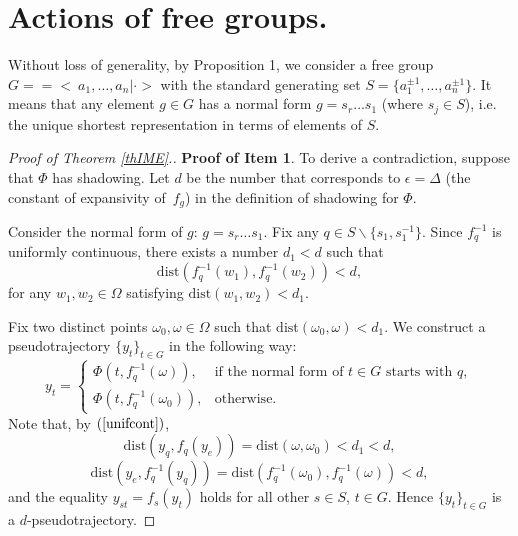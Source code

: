 \section{Actions of free groups.}

Without loss of generality, by Proposition 1, we consider a free group $G=\allowbreak=<~a_1,\ldots,a_n|\cdot>$ with the standard generating set $S = \{a_1^{\pm 1},\ldots,a_n^{\pm 1}\}$.
It means that any element $g\in G$ has a normal form $g=s_r\ldots s_1$ (where $s_j\in S$), i.e. the unique shortest representation in terms of elements of $S$.

\begin{proof}[Proof of Theorem \ref{thIME}.]

\textbf{Proof of Item 1}.
 To derive a contradiction, suppose that $\Phi$ has shadowing. Let $d$ be the number that corresponds to $\epsilon=\Delta$ (the constant of expansivity of~$f_g$) in the definition of shadowing for $\Phi$.

Consider the normal form of $g$: $g=s_r\ldots s_1$.
Fix any $q\in S\backslash \{s_1, s_1^{-1}\}$.
Since $f_{q}^{-1}$ is uniformly continuous, there exists a number $d_1<d$ such that
\begin{equation}
\label{unifcont}
\mbox{dist}(f_{q}^{-1}(w_1),f_{q}^{-1}(w_2))< d,
\end{equation}
for any $w_1,w_2\in\Omega$ satisfying $\mbox{dist}(w_1,w_2)< d_1$.

Fix two distinct points $\omega_0,\omega\in \Omega$ such that $\mbox{dist}(\omega_0,\omega)< d_1$. We construct a pseudotrajectory $\{y_t\}_{t\in G}$ in the following way:
$$
y_t = 
\begin{cases}
\Phi(t,f_{q}^{-1}(\omega)),& \mbox{if the normal form of $t\in G$ starts with $q$},\\
\Phi(t,f_{q}^{-1}(\omega_0)),& \mbox{otherwise}.
\end{cases}
$$
Note that, by $(\ref{unifcont})$,
$$\mbox{dist}(y_{q},f_{q}(y_e)) = \mbox{dist}(\omega,\omega_0)< d_1< d,$$
$$
\mbox{dist}(y_e, f_{q}^{-1}(y_{q})) = \mbox{dist}(f_{q}^{-1}(\omega_0),f_{q}^{-1}(\omega))< d,
$$
and the equality $y_{st} = f_s(y_t)$ holds for all other $s\in S$, $t\in G$. Hence $\{y_t\}_{t\in G}$ is a $d$-pseudotrajectory.


\end{proof}
